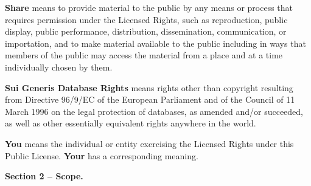 \begin{doclicense@enumerate}
\item \textbf{Share} means to provide material to the public by any means or process that requires permission under the Licensed Rights, such as reproduction, public display, public performance, distribution, dissemination, communication, or importation, and to make material available to the public including in ways that members of the public may access the material from a place and at a time individually chosen by them.
\item \textbf{Sui Generis Database Rights} means rights other than copyright resulting from Directive 96/9/EC of the European Parliament and of the Council of 11 March 1996 on the legal protection of databases, as amended and/or succeeded, as well as other essentially equivalent rights anywhere in the world.
\item \textbf{You} means the individual or entity exercising the Licensed Rights under this Public License. \textbf{Your} has a corresponding meaning.
\end{doclicense@enumerate}
\par \textbf{Section 2 – Scope.}
